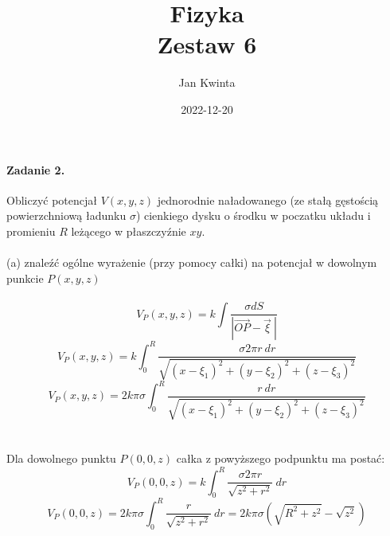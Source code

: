 \documentclass[14pt, table]{extarticle}
\title{Fizyka \\ \Large{Zestaw 6}}
\author{Jan Kwinta}
\date{2022-12-20}
\begin{document}
\maketitle

\paragraph{Zadanie 2.}
Obliczyć potencjał $V(x, y, z)$ jednorodnie naładowanego (ze stałą gęstością powierzchniową ładunku $\sigma$) cienkiego dysku o środku w poczatku układu i promieniu $R$ leżącego w płaszczyźnie $xy$. \\ \\
(a) znaleźć ogólne wyrażenie (przy pomocy całki) na potencjał w dowolnym punkcie
$P(x, y, z)$ \\ \\
$$ V_{P}(x, y, z) = k \int \frac{\sigma d S}{\left| \vec{OP} - \vec{\xi} \  \right|} $$
$$ V_{P}(x, y, z) = k \int_0^R \frac{\sigma 2 \pi r \ d r}{\sqrt{\left(x - \xi_1 \right)^2 + \left(y - \xi_2 \right)^2 + \left(z - \xi_3 \right)^2 }} $$
$$ V_{P}(x, y, z) = 2k \pi \sigma \int_0^R \frac{r \ d r}{\sqrt{\left(x - \xi_1 \right)^2 + \left(y - \xi_2 \right)^2 + \left(z - \xi_3 \right)^2 }} $$ \\ \\
Dla dowolnego punktu $P(0, 0, z)$ całka z powyższego podpunktu ma postać:
$$ V_{P}(0, 0, z) = k \int_0^R \frac{\sigma 2 \pi r}{\sqrt{z^2 + r^2}} \ d r$$
$$ V_{P}(0, 0, z) = 2 k \pi \sigma \int_0^R \frac{r}{\sqrt{z^2 + r^2}} \ d r = 2 k \pi \sigma \left( \sqrt{R^2 + z^2} - \sqrt{z^2} \right)$$
\\ \\

\newpage
\end{document}

